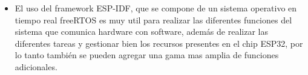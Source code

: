 \begin{itemize}
	\item El uso del framework ESP-IDF, que se compone de un sistema operativo en tiempo real freeRTOS es muy util para realizar las diferentes funciones del sistema que comunica hardware con software, además de realizar las diferentes tareas y gestionar bien los recursos presentes en el chip ESP32, por lo tanto también se pueden agregar una gama mas amplia de funciones adicionales.
	
\end{itemize}